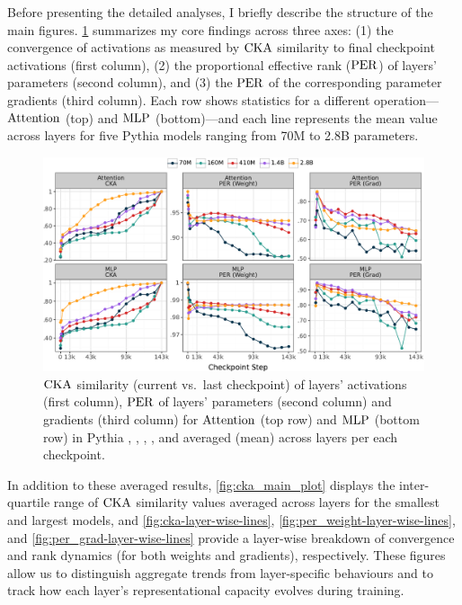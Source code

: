 Before presenting the detailed analyses, I briefly describe the structure of the main figures. \cref{fig:main-results} summarizes my core findings across three axes: (1) the convergence of activations as measured by $\mathrm{CKA}$ similarity to final checkpoint activations (first column), (2) the proportional effective rank ($\mathrm{PER}$) of layers' parameters (second column), and (3) the $\mathrm{PER}$ of the corresponding parameter gradients (third column). Each row shows statistics for a different operation—$\mathrm{Attention}$ (top) and $\mathrm{MLP}$ (bottom)—and each line represents the mean value across layers for five Pythia models ranging from 70M to 2.8B parameters.


\begin{figure}[h!]
    \centering
    \includegraphics[width=\linewidth]{chapters/tending-towards-stability/figures/results.pdf}
    \vspace{-15pt}
    \caption{$\mathrm{CKA}$ similarity (current vs.\ last checkpoint) of layers' activations (first column), $\mathrm{PER}$ of layers' parameters (second column) and gradients (third column) for $\mathrm{Attention}$ (top row) and $\mathrm{MLP}$ (bottom row) in Pythia \sevenmil, \sixmil, \fourmil, \onebil, and \twobil averaged (mean) across layers per each checkpoint.}
    \label{fig:main-results}
\end{figure}



In addition to these averaged results, \cref{fig:cka_main_plot} displays the inter-quartile range of $\mathrm{CKA}$ similarity values averaged across layers for the smallest and largest models, and \cref{fig:cka-layer-wise-lines}, \cref{fig:per_weight-layer-wise-lines}, and \cref{fig:per_grad-layer-wise-lines} provide a layer-wise breakdown of convergence and rank dynamics (for both weights and gradients), respectively. These figures allow us to distinguish aggregate trends from layer-specific behaviours and to track how each layer's representational capacity evolves during training.


